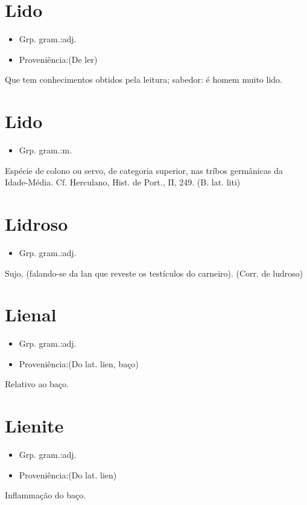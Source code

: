 \section{Lido}
\begin{itemize}
\item {Grp. gram.:adj.}
\end{itemize}
\begin{itemize}
\item {Proveniência:(De \textunderscore ler\textunderscore )}
\end{itemize}
Que tem conhecimentos obtidos pela leitura; sabedor: \textunderscore é homem muito lido\textunderscore .
\section{Lido}
\begin{itemize}
\item {Grp. gram.:m.}
\end{itemize}
Espécie de colono ou servo, de categoria superior, nas tríbos germânicas da Idade-Média. Cf. Herculano, \textunderscore Hist. de Port.\textunderscore , II, 249.
(B. lat. \textunderscore liti\textunderscore )
\section{Lidroso}
\begin{itemize}
\item {Grp. gram.:adj.}
\end{itemize}
Sujo, (falando-se da lan que reveste os testículos do carneiro).
(Corr. de \textunderscore ludroso\textunderscore )
\section{Lienal}
\begin{itemize}
\item {Grp. gram.:adj.}
\end{itemize}
\begin{itemize}
\item {Proveniência:(Do lat. \textunderscore lien\textunderscore , baço)}
\end{itemize}
Relativo ao baço.
\section{Lienite}
\begin{itemize}
\item {Grp. gram.:adj.}
\end{itemize}
\begin{itemize}
\item {Proveniência:(Do lat. \textunderscore lien\textunderscore )}
\end{itemize}
Inflammação do baço.
